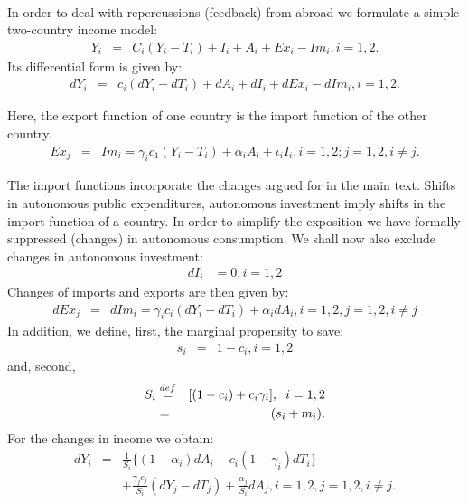 \documentclass[12pt,english]{article}
\begin{document}
\appendix
\begin{center}
 \\

\end{center}
In order to deal with repercussions (feedback) from abroad we
formulate a simple two-country income model:
\begin{eqnarray}
 Y_i &=& C_i(Y_i-T_i) + I_i + A_i + Ex_i - Im_i, i=1,2. \label{eq:e0}
\end{eqnarray}
Its differential form is given by:
\begin{eqnarray}
 dY_i &=& c_i (dY_i-dT_i)  + dA_i + dI_i +  dEx_i - dIm_i, i=1,2.  \label{eq:e4}
\end{eqnarray}

Here, the export function of  one country is the import function of
the other country.
\begin{eqnarray}
Ex_j &=&  Im_i = \gamma_i c_1(Y_i-T_i)+ \alpha_i A_i + \iota_i I_i,
i=1,2; j=1,2, i\neq j. \label{eq:e2}
\label{eq:e3}
\end{eqnarray}

The import functions incorporate the changes argued for in the main
text. Shifts in autonomous public expenditures, autonomous
investment imply shifts in the import function of a country. In
order to simplify the exposition we have formally suppressed
(changes) in autonomous consumption. We shall now also exclude
changes in autonomous investment:
 \begin{eqnarray}
 dI_i& = 0, i=1,2
\end{eqnarray}
Changes of imports and exports are then given by:
\begin{eqnarray}
dEx_j &=&  dIm_i = \gamma_i c_i(dY_i-dT_i)+ \alpha_i dA_i, i =1,2,
j=1,2, i\neq j \label{eq:e6}
 \label{eq:e7}
\end{eqnarray}
In addition, we define, first, the marginal propensity to save:
\begin{eqnarray}
s_i & = & 1-c_i, i=1,2
\end{eqnarray}
and, second,
\begin{eqnarray}
 S_i  &\stackrel{def}{=}& [ (1-c_i) + c_i
\gamma_i],\hspace{2mm} i=1,2 \\
& =& (s_i + m_i).
\end{eqnarray}
For the changes in income we obtain:
\begin{eqnarray}
 d Y_i & = & \frac{1}{S_i}\{(1-\alpha_i) dA_i -c_i(1-\gamma_i) dT_i \} \\
 & & + \frac{\gamma_j c_j}{S_i}(d Y_j-dT_j)+
 \frac{\alpha_j}{S_i}dA_j, i=1,2, j=1,2, i \neq j.
 \end{eqnarray}
\end{document}
